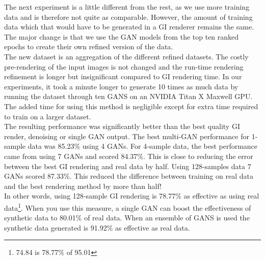 \documentclass[10pt,twocolumn,letterpaper]{article}
\begin{document}
The next experiment is a little different from the rest, as we use more training data and is therefore not quite as comparable.  However, the amount of training data which that would have to be generated in a GI renderer remains the same.  The major change is that we use the GAN models from the top ten ranked epochs to create their own refined version of the data.\\

The new dataset is an aggregation of the different refined datasets.  The costly pre-rendering of the input images is not changed and the run-time rendering refinement is longer but insignificant compared to GI rendering time.  In our experiments, it took a minute longer to generate 10 times as much data by running the dataset through ten GANS on an NVIDIA Titan X Maxwell GPU. %
The added time for using this method is negligible except for extra time required to train on a larger dataset.\\

The resulting performance was significantly better than the best quality GI render, denoising or single GAN output.  The best multi-GAN performance for 1-sample data was 85.23\% using 4 GANs.  For 4-sample data, the best performance came from using 7 GANs and scored 84.37\%. This is close to reducing the error between the best GI rendering and real data by half. Using 128-samples data 7 GANs scored 87.33\%. This reduced the difference between training on real data and the best rendering method by more than half!\\ 

In other words, using 128-sample GI rendering is 78.77\% as effective as using real data\footnote{74.84 is 78.77\% of 95.01}.  When you use this measure, a single GAN can boost the effectiveness of synthetic data to 80.01\% of real data.  When an ensemble of GANS is used the synthetic data generated is 91.92\% as effective as real data. 
\\

\end{document}
